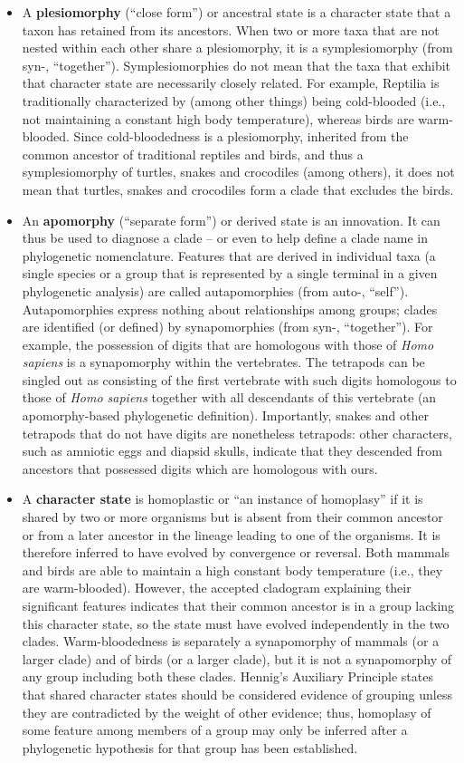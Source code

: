 \begin{itemize}
\item
  A \textbf{plesiomorphy} (``close form'') or ancestral state is a character state that a taxon has retained from its ancestors. When two or more taxa that are not nested within each other share a plesiomorphy, it is a symplesiomorphy (from syn-, ``together''). Symplesiomorphies do not mean that the taxa that exhibit that character state are necessarily closely related. For example, Reptilia is traditionally characterized by (among other things) being cold-blooded (i.e., not maintaining a constant high body temperature), whereas birds are warm-blooded. Since cold-bloodedness is a plesiomorphy, inherited from the common ancestor of traditional reptiles and birds, and thus a symplesiomorphy of turtles, snakes and crocodiles (among others), it does not mean that turtles, snakes and crocodiles form a clade that excludes the birds.
\item
  An \textbf{apomorphy} (``separate form'') or derived state is an innovation. It can thus be used to diagnose a clade -- or even to help define a clade name in phylogenetic nomenclature. Features that are derived in individual taxa (a single species or a group that is represented by a single terminal in a given phylogenetic analysis) are called autapomorphies (from auto-, ``self''). Autapomorphies express nothing about relationships among groups; clades are identified (or defined) by synapomorphies (from syn-, ``together''). For example, the possession of digits that are homologous with those of \emph{Homo sapiens} is a synapomorphy within the vertebrates. The tetrapods can be singled out as consisting of the first vertebrate with such digits homologous to those of \emph{Homo sapiens} together with all descendants of this vertebrate (an apomorphy-based phylogenetic definition). Importantly, snakes and other tetrapods that do not have digits are nonetheless tetrapods: other characters, such as amniotic eggs and diapsid skulls, indicate that they descended from ancestors that possessed digits which are homologous with ours.
\item
  A \textbf{character state} is homoplastic or ``an instance of homoplasy'' if it is shared by two or more organisms but is absent from their common ancestor or from a later ancestor in the lineage leading to one of the organisms. It is therefore inferred to have evolved by convergence or reversal. Both mammals and birds are able to maintain a high constant body temperature (i.e., they are warm-blooded). However, the accepted cladogram explaining their significant features indicates that their common ancestor is in a group lacking this character state, so the state must have evolved independently in the two clades. Warm-bloodedness is separately a synapomorphy of mammals (or a larger clade) and of birds (or a larger clade), but it is not a synapomorphy of any group including both these clades. Hennig's Auxiliary Principle states that shared character states should be considered evidence of grouping unless they are contradicted by the weight of other evidence; thus, homoplasy of some feature among members of a group may only be inferred after a phylogenetic hypothesis for that group has been established.
\end{itemize}


